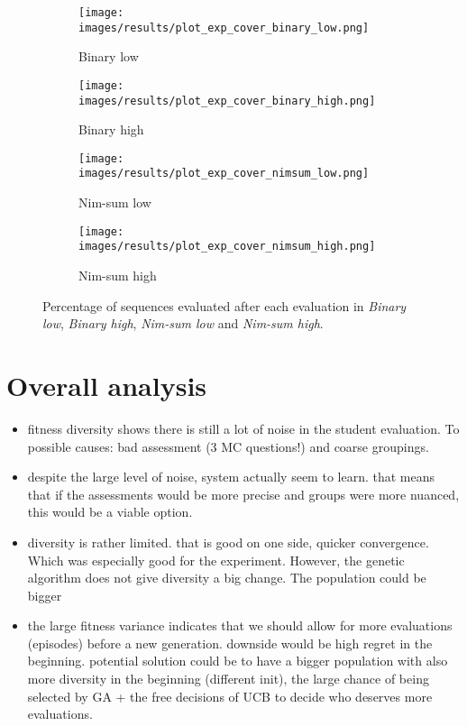 

\begin{figure}[ht]
	\begin{subfigure}{0.49\linewidth}
	\centering
	\texttt{[image: images/results/plot\_exp\_cover\_binary\_low.png]}
	\caption{Binary low}
	\label{fig:exp_cover_binary_low}
	\end{subfigure}
	\hfill
	\begin{subfigure}{0.49\linewidth}
	\centering
	\texttt{[image: images/results/plot\_exp\_cover\_binary\_high.png]}
	\caption{Binary high}
	\label{fig:exp_cover_binary_high}
	\end{subfigure}
	\begin{subfigure}{0.49\linewidth}
	\centering
	\texttt{[image: images/results/plot\_exp\_cover\_nimsum\_low.png]}
	\caption{Nim-sum low}
	\label{fig:exp_cover_nimsum_low}
	\end{subfigure}
	\hfill
	\begin{subfigure}{0.49\linewidth}
	\centering
	\texttt{[image: images/results/plot\_exp\_cover\_nimsum\_high.png]}
	\caption{Nim-sum high}
	\label{fig:exp_cover_nimsum_high}
	\end{subfigure}
	\caption{Percentage of sequences evaluated after each evaluation in
	\emph{Binary low}, \emph{Binary high}, \emph{Nim-sum low} and \emph{Nim-sum
	high}.}
	\label{fig:exp_cover2}
\end{figure}

\section{Overall analysis}
\begin{itemize}
	\item fitness diversity shows there is still a lot of noise in the student
		evaluation. To possible causes: bad assessment (3 MC questions!) and
		coarse groupings.
	\item despite the large level of noise, system actually seem to learn. that
		means that if the assessments would be more precise and groups were
		more nuanced, this would be a viable option.
	\item diversity is rather limited. that is good on one side, quicker
		convergence. Which was especially good for the experiment. However, the
		genetic algorithm does not give diversity a big change. The population
		could be bigger
	\item the large fitness variance indicates that we should allow for more
		evaluations (episodes) before a new generation. downside would be high
		regret in the beginning. potential solution could be to have a bigger
		population with also more diversity in the beginning (different init),
		the large chance of being selected by GA + the free decisions of UCB to
		decide who deserves more evaluations.
\end{itemize}
